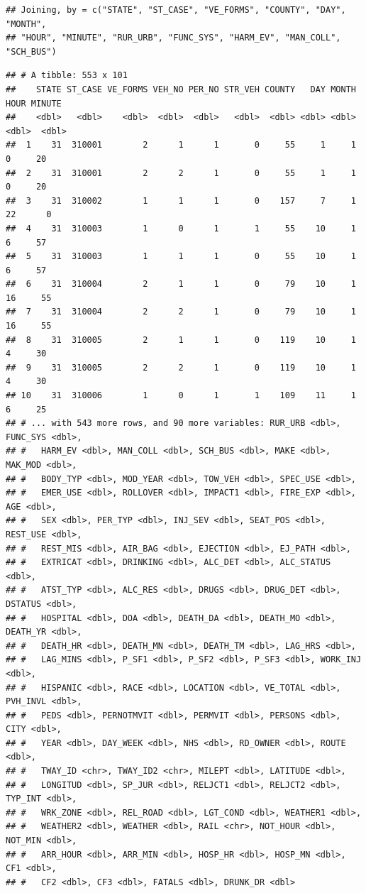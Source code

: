 \documentclass[]{book}
\newenvironment{Shaded}{\begin{snugshade}}{\end{snugshade}}
\newcommand{\KeywordTok}[1]{\textcolor[rgb]{0.13,0.29,0.53}{\textbf{#1}}}
\newcommand{\NormalTok}[1]{#1}
\newcommand{\OperatorTok}[1]{\textcolor[rgb]{0.81,0.36,0.00}{\textbf{#1}}}
\newcommand{\StringTok}[1]{\textcolor[rgb]{0.31,0.60,0.02}{#1}}
\begin{document}
\begin{Shaded}
\end{Shaded}

\begin{verbatim}
## Joining, by = c("STATE", "ST_CASE", "VE_FORMS", "COUNTY", "DAY", "MONTH",
## "HOUR", "MINUTE", "RUR_URB", "FUNC_SYS", "HARM_EV", "MAN_COLL", "SCH_BUS")
\end{verbatim}

\begin{verbatim}
## # A tibble: 553 x 101
##    STATE ST_CASE VE_FORMS VEH_NO PER_NO STR_VEH COUNTY   DAY MONTH  HOUR MINUTE
##    <dbl>   <dbl>    <dbl>  <dbl>  <dbl>   <dbl>  <dbl> <dbl> <dbl> <dbl>  <dbl>
##  1    31  310001        2      1      1       0     55     1     1     0     20
##  2    31  310001        2      2      1       0     55     1     1     0     20
##  3    31  310002        1      1      1       0    157     7     1    22      0
##  4    31  310003        1      0      1       1     55    10     1     6     57
##  5    31  310003        1      1      1       0     55    10     1     6     57
##  6    31  310004        2      1      1       0     79    10     1    16     55
##  7    31  310004        2      2      1       0     79    10     1    16     55
##  8    31  310005        2      1      1       0    119    10     1     4     30
##  9    31  310005        2      2      1       0    119    10     1     4     30
## 10    31  310006        1      0      1       1    109    11     1     6     25
## # ... with 543 more rows, and 90 more variables: RUR_URB <dbl>, FUNC_SYS <dbl>,
## #   HARM_EV <dbl>, MAN_COLL <dbl>, SCH_BUS <dbl>, MAKE <dbl>, MAK_MOD <dbl>,
## #   BODY_TYP <dbl>, MOD_YEAR <dbl>, TOW_VEH <dbl>, SPEC_USE <dbl>,
## #   EMER_USE <dbl>, ROLLOVER <dbl>, IMPACT1 <dbl>, FIRE_EXP <dbl>, AGE <dbl>,
## #   SEX <dbl>, PER_TYP <dbl>, INJ_SEV <dbl>, SEAT_POS <dbl>, REST_USE <dbl>,
## #   REST_MIS <dbl>, AIR_BAG <dbl>, EJECTION <dbl>, EJ_PATH <dbl>,
## #   EXTRICAT <dbl>, DRINKING <dbl>, ALC_DET <dbl>, ALC_STATUS <dbl>,
## #   ATST_TYP <dbl>, ALC_RES <dbl>, DRUGS <dbl>, DRUG_DET <dbl>, DSTATUS <dbl>,
## #   HOSPITAL <dbl>, DOA <dbl>, DEATH_DA <dbl>, DEATH_MO <dbl>, DEATH_YR <dbl>,
## #   DEATH_HR <dbl>, DEATH_MN <dbl>, DEATH_TM <dbl>, LAG_HRS <dbl>,
## #   LAG_MINS <dbl>, P_SF1 <dbl>, P_SF2 <dbl>, P_SF3 <dbl>, WORK_INJ <dbl>,
## #   HISPANIC <dbl>, RACE <dbl>, LOCATION <dbl>, VE_TOTAL <dbl>, PVH_INVL <dbl>,
## #   PEDS <dbl>, PERNOTMVIT <dbl>, PERMVIT <dbl>, PERSONS <dbl>, CITY <dbl>,
## #   YEAR <dbl>, DAY_WEEK <dbl>, NHS <dbl>, RD_OWNER <dbl>, ROUTE <dbl>,
## #   TWAY_ID <chr>, TWAY_ID2 <chr>, MILEPT <dbl>, LATITUDE <dbl>,
## #   LONGITUD <dbl>, SP_JUR <dbl>, RELJCT1 <dbl>, RELJCT2 <dbl>, TYP_INT <dbl>,
## #   WRK_ZONE <dbl>, REL_ROAD <dbl>, LGT_COND <dbl>, WEATHER1 <dbl>,
## #   WEATHER2 <dbl>, WEATHER <dbl>, RAIL <chr>, NOT_HOUR <dbl>, NOT_MIN <dbl>,
## #   ARR_HOUR <dbl>, ARR_MIN <dbl>, HOSP_HR <dbl>, HOSP_MN <dbl>, CF1 <dbl>,
## #   CF2 <dbl>, CF3 <dbl>, FATALS <dbl>, DRUNK_DR <dbl>
\end{verbatim}
\end{document}
